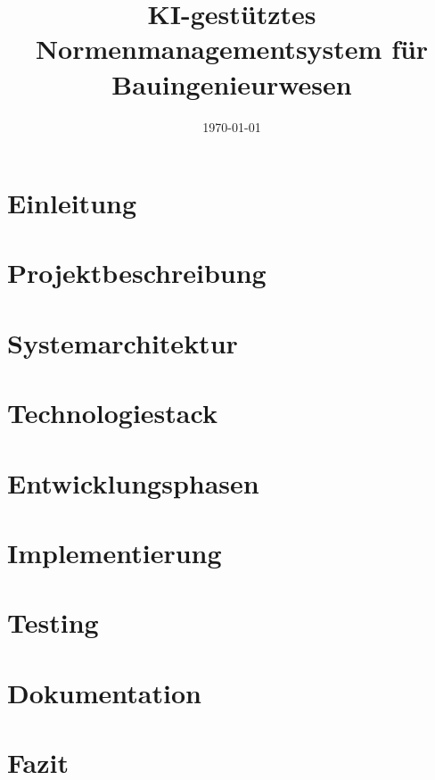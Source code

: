 \documentclass[a4paper,11pt]{scrartcl}
\title{KI-gestütztes Normenmanagementsystem für Bauingenieurwesen}
\author{}
\date{\today}
\newcommand{\inputsection}[1]{
    
}
\begin{document}
\maketitle
\tableofcontents
\newpage

\section{Einleitung}
\inputsection{einleitung}

\section{Projektbeschreibung}
\inputsection{projektbeschreibung}

\section{Systemarchitektur}
\inputsection{systemarchitektur}

\section{Technologiestack}
\inputsection{technologiestack}

\section{Entwicklungsphasen}
\inputsection{entwicklungsphasen}

\section{Implementierung}
\inputsection{implementierung}

\section{Testing}
\inputsection{testing}

\section{Dokumentation}
\inputsection{dokumentation}

\section{Fazit}
\inputsection{fazit}
\end{document}
